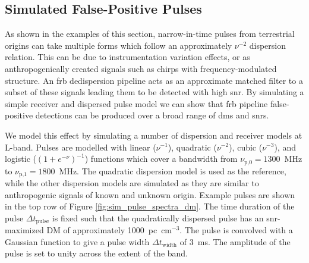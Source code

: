 \documentclass[a4paper,fleqn,usenatbib]{mnras}
\begin{document}
\subsection{Simulated False-Positive Pulses}
\label{sec:sim_pulses}

As shown in the examples of this section, narrow-in-time pulses from terrestrial
origins can take multiple forms which follow an approximately $\nu^{-2}$
dispersion relation. This can be due to instrumentation variation effects, or as
anthropogenically created signals such as chirps with frequency-modulated
structure.  An \gls{frb} dedispersion pipeline acts as an approximate matched
filter to a subset of these signals leading them to be detected with high
\gls{snr}. By simulating a simple receiver and dispersed pulse model we can show
that \gls{frb} pipeline false-positive detections can be produced over a broad
range of \glspl{dm} and \glspl{snr}.

We model this effect by simulating a number of dispersion and receiver models at
L-band.  Pulses are modelled with linear ($\nu^{-1}$), quadratic ($\nu^{-2}$),
cubic ($\nu^{-3}$), and logistic ($(1+e^{-\nu})^{-1}$) functions which
cover a bandwidth from $\nu_{\textrm{p,0}} = 1300$~MHz to $\nu_{\textrm{p,1}} =
1800$~MHz.  The quadratic dispersion model is used as the reference, while the other
dispersion models are simulated as they are similar to anthropogenic signals of
known and unknown origin.  Example pulses are shown in the top row of Figure
\ref{fig:sim_pulse_spectra_dm}. The time duration of the pulse $\Delta
t_{\textrm{pulse}}$ is fixed such that the quadratically dispersed pulse has an
\gls{snr}-maximized DM of approximately 1000~pc~cm$^{-3}$. The pulse is
convolved with a Gaussian function to give a pulse width $\Delta
t_{\textrm{width}}$ of 3~ms. The amplitude of the pulse is set to unity across
the extent of the band.
\end{document}
